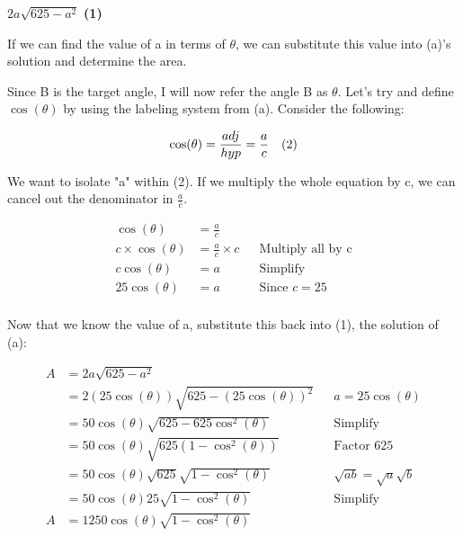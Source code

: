 \documentclass[12pt]{book}
\begin{document}
\begin{enumerate}
\begin{center}
    $2a\sqrt{625 - a^2}$ \textbf{(1)} 
\end{center}

\vspace{0.2cm}
If we can find the value of a in terms of $\theta$, 
we can substitute this value into (a)'s solution and determine the area.

\vspace{0.3cm}
Since B is the target angle, I will now refer the angle B as $\theta$. 
Let's try and define $\cos(\theta)$ by using the labeling system from (a). 
Consider the following:

$$\cos(\theta) = \frac{adj}{hyp} = \frac{a}{c} \text{\space \space \space (2)}$$

We want to isolate "a" within (2). If we multiply the whole equation by c, we can 
cancel out the denominator in $\frac{a}{c}$.

\begin{align*}
    \cos(\theta) &= \frac{a}{c} \\
    c \times \cos(\theta) &= \frac{a}{c} \times c && \text{Multiply all by c}\\
    c\cos(\theta) &= a && \text{Simplify}\\
    25\cos(\theta) &= a && \text{Since } c = 25\\
\end{align*}

\newpage

\begin{center}
    Now that we know the value of a, substitute this back into (1), the solution of (a):
\end{center}
\vspace{-0.5cm}

\begin{align*}
    A &= 2a\sqrt{625 - a^2} \\
    &= 2(25\cos(\theta))\sqrt{625 - (25\cos(\theta))^2} && a=25\cos(\theta)\\
    &= 50\cos(\theta)\sqrt{625 - 625\cos^2(\theta)} && \text{Simplify}\\
    &= 50\cos(\theta)\sqrt{625(1 - \cos^2(\theta))} && \text{Factor 625}\\
    &= 50\cos(\theta)\sqrt{625} \sqrt{1 - \cos^2(\theta)} && \sqrt{ab} = \sqrt{a}\sqrt{b}\\ %
    &= 50\cos(\theta)25 \sqrt{1 - \cos^2(\theta)} && \text{Simplify} \\
    A &= 1250\cos(\theta)\sqrt{1 - \cos^2(\theta)} \\
\end{align*}


\end{enumerate}
\end{document}
